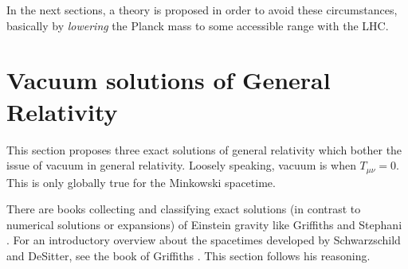 \documentclass[12pt,a4paper]{report}
\numberwithin{equation}{chapter}
\begin{document}
In the next sections, a theory is proposed in order to avoid these circumstances, basically by \emph{lowering} the Planck mass to some accessible range with the LHC.


\section{Vacuum solutions of General Relativity}\label{sec:exact-sols}
This section proposes three exact solutions of general relativity which bother the issue of vacuum in general relativity. Loosely speaking, vacuum is when $T_{\mu\nu}=0$. This is only globally true for the Minkowski spacetime.

There are books collecting and classifying exact solutions (in contrast to numerical solutions or expansions) of Einstein gravity like Griffiths \cite{griffiths2009exact} and Stephani \cite{stephani}. For an introductory overview about the spacetimes developed by Schwarzschild and DeSitter, see the book of Griffiths \cite{griffiths2009exact}. This section follows his reasoning.

\end{document}

